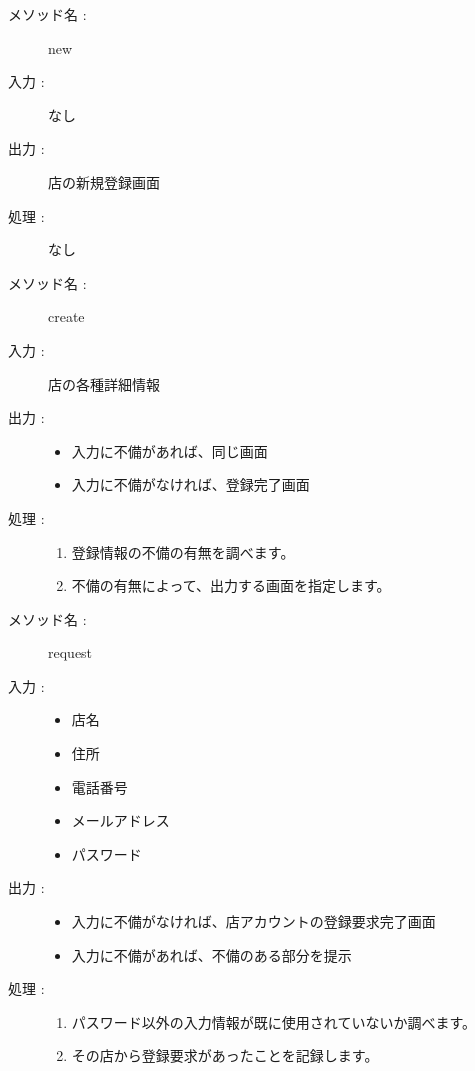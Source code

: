 \documentclass[a4j,titlepage]{jarticle}
\begin{document}
\begin{description}
  \item [メソッド名 :] new
  \item [入力 :] なし
  \item [出力 :] 店の新規登録画面
  \item [処理 :]
  なし
\end{description}

\begin{description}
  \item [メソッド名 :] create
  \item [入力 :] 店の各種詳細情報
  \item [出力 :]\mbox{}
  \begin{itemize}
    \item 入力に不備があれば、同じ画面
    \item 入力に不備がなければ、登録完了画面
  \end{itemize}
  \item [処理 :]\mbox{}
  \begin{enumerate}
    \item 登録情報の不備の有無を調べます。
    \item 不備の有無によって、出力する画面を指定します。
  \end{enumerate}
\end{description}

\begin{description}
  \item [メソッド名 :] request
  \item [入力 :]\mbox{}
  \begin{itemize}
    \item 店名
    \item 住所
    \item 電話番号
    \item メールアドレス
    \item パスワード
  \end{itemize}
  \item [出力 :]\mbox{}
  \begin{itemize}
    \item 入力に不備がなければ、店アカウントの登録要求完了画面
    \item 入力に不備があれば、不備のある部分を提示
  \end{itemize}
  \item [処理 :]\mbox{}
  \begin{enumerate}
    \item パスワード以外の入力情報が既に使用されていないか調べます。
    \item その店から登録要求があったことを記録します。
  \end{enumerate}
\end{description}
\end{document}
